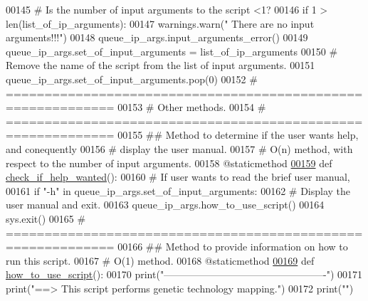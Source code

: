 \begin{DoxyCode}
00145         \textcolor{comment}{#   Is the number of input arguments to the script <1?}
00146         \textcolor{keywordflow}{if} 1 > len(list\_of\_ip\_arguments):
00147             warnings.warn(\textcolor{stringliteral}{" There are no input arguments!!!"})
00148             queue\_ip\_args.input\_arguments\_error()
00149         queue\_ip\_args.set\_of\_input\_arguments = list\_of\_ip\_arguments
00150         \textcolor{comment}{# Remove the name of the script from the list of input arguments.}
00151         queue\_ip\_args.set\_of\_input\_arguments.pop(0)
00152     \textcolor{comment}{# ============================================================}
00153     \textcolor{comment}{#   Other methods.}
00154     \textcolor{comment}{# ============================================================}
00155     \textcolor{comment}{##  Method to determine if the user wants help, and conequently}
00156     \textcolor{comment}{#       display the user manual.}
00157     \textcolor{comment}{#   O(n) method, with respect to the number of input arguments.}
00158     @staticmethod
\hypertarget{queue__ip__arguments_8py_source_l00159}{}\hyperlink{classutilities_1_1queue__ip__arguments_1_1queue__ip__args_a1a87ae4035acfa51fe1d1aff53f770f3}{00159}     \textcolor{keyword}{def }\hyperlink{classutilities_1_1queue__ip__arguments_1_1queue__ip__args_a1a87ae4035acfa51fe1d1aff53f770f3}{check\_if\_help\_wanted}():
00160         \textcolor{comment}{# If user wants to read the brief user manual,}
00161         \textcolor{keywordflow}{if} \textcolor{stringliteral}{"-h"} \textcolor{keywordflow}{in} queue\_ip\_args.set\_of\_input\_arguments:
00162             \textcolor{comment}{# Display the user manual and exit.}
00163             queue\_ip\_args.how\_to\_use\_script()
00164             sys.exit()
00165     \textcolor{comment}{# ============================================================}
00166     \textcolor{comment}{##  Method to provide information on how to run this script.}
00167     \textcolor{comment}{#   O(1) method.}
00168     @staticmethod
\hypertarget{queue__ip__arguments_8py_source_l00169}{}\hyperlink{classutilities_1_1queue__ip__arguments_1_1queue__ip__args_a5fecd33a91d20f19acba2fb1b8d1a60e}{00169}     \textcolor{keyword}{def }\hyperlink{classutilities_1_1queue__ip__arguments_1_1queue__ip__args_a5fecd33a91d20f19acba2fb1b8d1a60e}{how\_to\_use\_script}():
00170         print(\textcolor{stringliteral}{"-------------------------------------------------"})
00171         print(\textcolor{stringliteral}{"==>  This script performs genetic technology mapping."})
00172         print(\textcolor{stringliteral}{""})

\end{DoxyCode}
